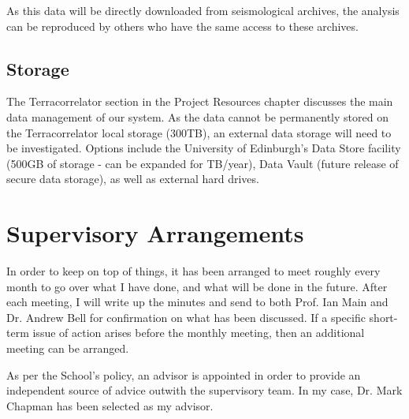 \documentclass[12pt]{report}
\begin{document}
As this data will be directly downloaded from seismological archives, the analysis can be reproduced by others who have the same access to these archives.

\section{Storage}
The Terracorrelator section in the Project Resources chapter discusses the main data management of our system. As the data cannot be permanently stored on the Terracorrelator local storage (300TB), an external data storage will need to be investigated. Options include the University of Edinburgh's Data Store facility (500GB of storage - can be expanded for  TB/year), Data Vault (future release of secure data storage), as well as external hard drives.  

\chapter{Supervisory Arrangements}
In order to keep on top of things, it has been arranged to meet roughly every month to go over what I have done, and what will be done in the future. After each meeting, I will write up the minutes and send to both Prof. Ian Main and Dr. Andrew Bell for confirmation on what has been discussed. If a specific short-term issue of action arises before the monthly meeting, then an additional meeting can be arranged. 

As per the School's policy, an advisor is appointed in order to provide an independent source of advice outwith the supervisory team. In my case, Dr. Mark Chapman has been selected as my advisor. 


\end{document}
